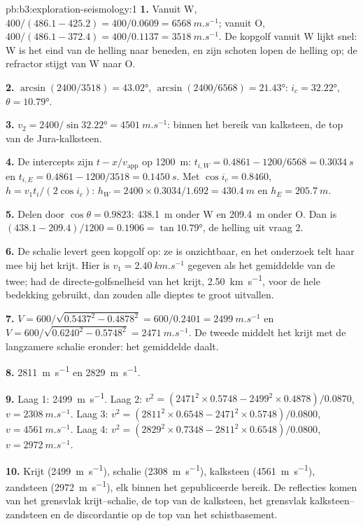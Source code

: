 \begin{solution}{pb:b3:exploration-seismology:1}
\textbf{1.} Vanuit W, $400/(486.1 - 425.2) = 400/0.0609 = \qty{6568}{m.s^{-1}}$;
vanuit O, $400/(486.1 - 372.4) = 400/0.1137 = \qty{3518}{m.s^{-1}}$. De
kopgolf vanuit W lijkt snel: W is het eind van de helling naar beneden, en zijn schoten lopen de helling op; de
refractor stijgt van W naar O.

\textbf{2.} $\arcsin(2400/3518) = \ang{43.02}$, $\arcsin(2400/6568) =
\ang{21.43}$: $i_c = \ang{32.22}$, $\theta = \ang{10.79}$.

\textbf{3.} $v_2 = 2400/\sin\ang{32.22} = \qty{4501}{m.s^{-1}}$: binnen het
bereik van kalksteen, de top van de Jura-kalksteen.

\textbf{4.} De intercepts zijn $t - x/v_{\text{app}}$ op \qty{1200}{m}:
$t_{i,W} = 0.4861 - 1200/6568 = \qty{0.3034}{s}$ en $t_{i,E} = 0.4861 -
1200/3518 = \qty{0.1450}{s}$. Met $\cos i_c = 0.8460$, $h = v_1t_i/(2\cos
i_c)$: $h_W = 2400\times0.3034/1.692 = \qty{430.4}{m}$ en $h_E =
\qty{205.7}{m}$.

\textbf{5.} Delen door $\cos\theta = 0.9823$: \qty{438.1}{m} onder W en
\qty{209.4}{m} onder O. Dan is $(438.1 - 209.4)/1200 = 0.1906 =
\tan\ang{10.79}$, de helling uit vraag 2.

\textbf{6.} De schalie levert geen kopgolf op: ze is onzichtbaar, en het
onderzoek telt haar mee bij het krijt. Hier is $v_1 = \qty{2.40}{km.s^{-1}}$ gegeven als
het gemiddelde van de twee; had de directe-golfsnelheid van het krijt, \qty{2.50}{km.s^{-1}},
voor de hele bedekking gebruikt, dan zouden alle dieptes te groot uitvallen.

\textbf{7.} $V = 600/\sqrt{0.5437^2 - 0.4878^2} = 600/0.2401 =
\qty{2499}{m.s^{-1}}$ en $V = 600/\sqrt{0.6240^2 - 0.5748^2} =
\qty{2471}{m.s^{-1}}$. De tweede middelt het krijt met de langzamere schalie
eronder: het gemiddelde daalt.

\textbf{8.} \qty{2811}{m.s^{-1}} en \qty{2829}{m.s^{-1}}.

\textbf{9.} Laag 1: \qty{2499}{m.s^{-1}}. Laag 2: $v^2 = (2471^2\times0.5748
- 2499^2\times0.4878)/0.0870$, $v = \qty{2308}{m.s^{-1}}$. Laag 3:
$v^2 = (2811^2\times0.6548 - 2471^2\times0.5748)/0.0800$,
$v = \qty{4561}{m.s^{-1}}$. Laag 4: $v^2 = (2829^2\times0.7348 -
2811^2\times0.6548)/0.0800$, $v = \qty{2972}{m.s^{-1}}$.

\textbf{10.} Krijt (\qty{2499}{m.s^{-1}}), schalie (\qty{2308}{m.s^{-1}}),
kalksteen (\qty{4561}{m.s^{-1}}), zandsteen (\qty{2972}{m.s^{-1}}), elk binnen
het gepubliceerde bereik. De reflecties komen van het grensvlak krijt--schalie,
de top van de kalksteen, het grensvlak kalksteen--zandsteen en de
discordantie op de top van het schistbasement.


\end{solution}
